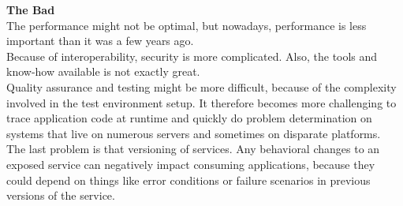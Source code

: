 \documentclass[12pt]{article}
\begin{document}
\noindent\textbf{The Bad} \\
The performance might not be optimal, but nowadays, performance is less important than it was a few years ago. \\
Because of interoperability, security is more complicated. Also, the tools and know-how available is not exactly great.\\
Quality assurance and testing might be more difficult, because of the complexity involved in the test environment setup. It therefore becomes more challenging to trace application code at runtime and quickly do problem determination on systems that live on numerous servers and sometimes on disparate platforms.
\\
The last problem is that versioning of services. Any behavioral changes to an exposed service can negatively impact consuming applications, because they could  depend on things like error conditions or failure scenarios in previous versions of the service. \cite{pcsoa}
\end{document}
